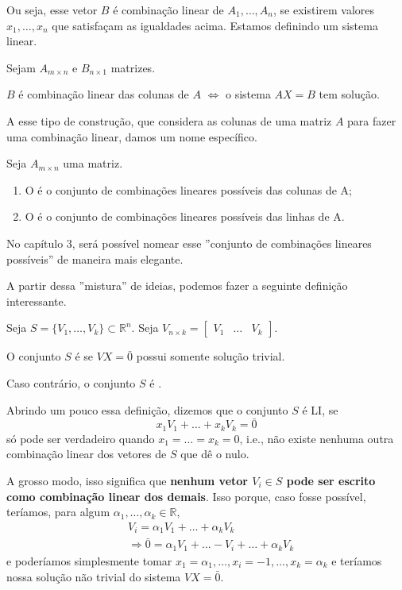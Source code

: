\documentclass[../main.tex]{subfiles}
\begin{document}
		Ou seja, esse vetor $B$ é combinação linear de $A_1,\dots,A_n$, se existirem valores $x_1,\dots,x_n$ que satisfaçam as igualdades acima. Estamos definindo um sistema linear.
		\begin{proposicao}Sejam $A_{m\times n}$ e $B_{n\times 1}$ matrizes.
			
			$B$ é combinação linear das colunas de $A$ $\Leftrightarrow$ o sistema $AX=B$ tem solução. 
		\end{proposicao}
		A esse tipo de construção, que considera as colunas de uma matriz $A$ para fazer uma combinação linear, damos um nome específico.
		\begin{definicao}
			Seja $A_{m\times n}$ uma matriz.
			\begin{enumerate}[label=\roman*)]
				\item O  é o conjunto de combinações lineares possíveis das colunas de A;
				\item O  é o conjunto de combinações lineares possíveis das linhas de A.
			\end{enumerate}
		\end{definicao}
		
		No capítulo 3, será possível nomear esse ''conjunto de combinações lineares possíveis'' de maneira mais elegante.
		
		A partir dessa ''mistura'' de ideias, podemos fazer a seguinte definição interessante.
		\begin{definicao}
			Seja $S=\{V_1,\dots,V_k\}\subset\mathbb{R}^n$. Seja $V_{n\times k}=\begin{bmatrix}
				V_1 & \dots & V_k
			\end{bmatrix}$.
			
			O conjunto $S$ é  se $VX=\bar{0}$ possui somente solução trivial.
			
			Caso contrário, o conjunto $S$ é \azul{linearmente dependente (LD)}.
		\end{definicao}
		Abrindo um pouco essa definição, dizemos que o conjunto $S$ é LI, se
		\[
		x_1V_1+\dots+x_kV_k=\bar{0}
		\]
		só pode ser verdadeiro quando $x_1=\dots=x_k=0$, i.e., não existe nenhuma outra combinação linear dos vetores de $S$ que dê o nulo.
		
		A grosso modo, isso significa que \textbf{nenhum vetor $V_i\in S$ pode ser escrito como combinação linear dos demais}. Isso porque, caso fosse possível, teríamos, para algum $\alpha_1,\dots,\alpha_k\in\mathbb{R}$,
		\begin{align*}
			&V_i=\alpha_1V_1+\dots+\alpha_kV_k\\
			&\Rightarrow \bar{0}=\alpha_1V_1+\dots -V_{i}+\dots+\alpha_kV_k
		\end{align*}
		e poderíamos simplesmente tomar $x_1=\alpha_1, \dots, x_i=-1,\dots, x_k=\alpha_k$ e teríamos nossa solução não trivial do sistema $VX=\bar{0}$.
		
\end{document}
